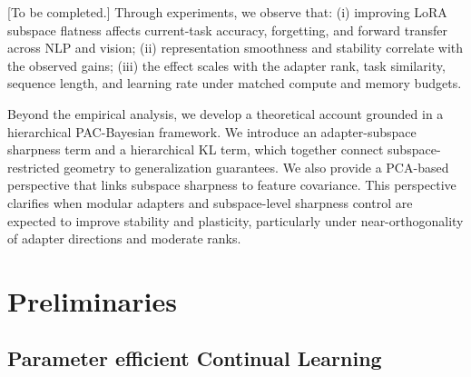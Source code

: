 \documentclass{article} %
\begin{document}
 [To be completed.] Through experiments, we observe that: 
(i) improving LoRA subspace flatness affects current-task accuracy, forgetting, and forward transfer across NLP and vision; 
(ii) representation smoothness and stability correlate with the observed gains; 
(iii) the effect scales with the adapter rank, task similarity, sequence length, and learning rate under matched compute and memory budgets.


Beyond the empirical analysis, we develop a theoretical account grounded in a hierarchical PAC-Bayesian framework. We introduce an adapter-subspace sharpness term and a hierarchical KL term, which together connect subspace-restricted geometry to generalization guarantees. We also provide a PCA-based perspective that links subspace sharpness to feature covariance. This perspective clarifies when modular adapters and subspace-level sharpness control are expected to improve stability and plasticity, particularly under near-orthogonality of adapter directions and moderate ranks.


\section{Preliminaries}

\subsection{Parameter efficient Continual Learning}








\end{document}
